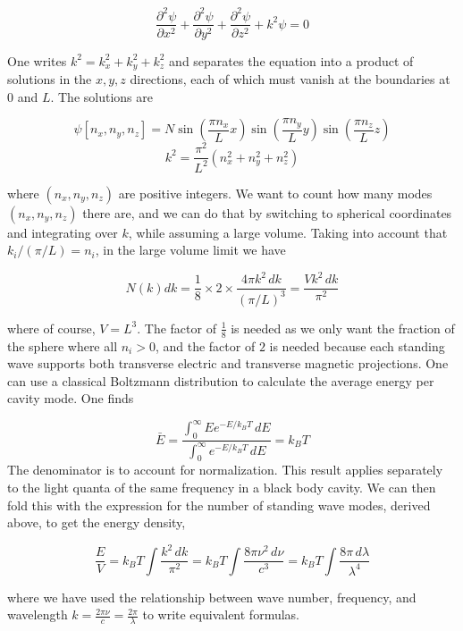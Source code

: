 \[
\frac{\partial^2 \psi}{\partial x^2} + \frac{\partial^2 \psi}{\partial y^2}
+ \frac{\partial^2 \psi}{\partial z^2} + k^2\psi = 0
\] \vspace{3px}

One writes $k^2 = k_x^2 + k_y^2 + k_z^2$ and separates the equation into
a product of solutions in the $x, y, z$ directions, each of which must vanish
at the boundaries at $0$ and $L$. The solutions are 

\[
  \psi[n_x, n_y, n_z] = N\sin \left( \frac{\pi n_x}{L}x \right) \sin \left(
  \frac{\pi n_y}{L}y\right) \sin \left( \frac{\pi n_z}{L}z \right)
  \] \[ k^2 = \frac{\pi^2}{L^2}(n_x^2 + n_y^2 + n_z^2) \]



where $(n_x, n_y, n_z)$ are positive integers. We want to count how many modes
$(n_x, n_y, n_z)$ there are, and we can do that by switching to spherical
coordinates and integrating over $k$, while assuming a large volume. Taking
into account that $k_i / (\pi / L) = n_i$, in the large volume limit we have

\[
N(k)dk = \frac{1}{8} \times 2 \times \frac{4\pi k^2 \, dk}{(\pi / L)^3}
= \frac{Vk^2 \, dk}{\pi^2}
\] \vspace{3px}

where of course, $V = L^3$. The factor of $\frac{1}{8}$ is needed as we only
want the fraction of the sphere where all $n_i > 0$, and the factor of $2$ is
needed because each standing wave supports both transverse electric and
transverse magnetic projections. 
One can use a classical Boltzmann distribution to calculate the average energy
per cavity mode. One finds 

\[
  \bar{E} = \frac{\int_0^\infty E e^{-E / k_B T} \, dE}{\int_0^\infty e^{-E
  / k_B T} \, dE} = k_B T
\] \vspace{3px}
The denominator is to account for normalization. This result applies separately
to the light quanta of the same frequency in a black body cavity. We can then
fold this with the expression for the number of standing wave modes, derived
above, to get the energy density, 

\[
  \frac{E}{V} = k_B T \int \frac{k^2\, dk}{\pi^2} = k_B T \int \frac{8\pi \nu^2
  \, d\nu}{c^3} = k_B T \int \frac{8\pi \, d\lambda}{\lambda^4}
\] \vspace{3px}

where we have used the relationship between wave number, frequency, and
wavelength $k = \frac{2\pi \nu}{c} = \frac{2\pi}{\lambda}$ to write equivalent
formulas. 

